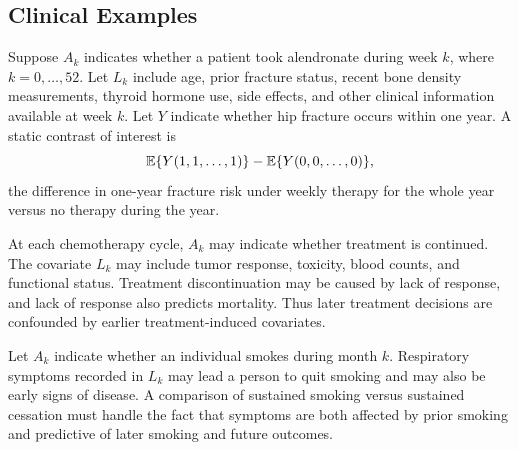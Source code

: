 \subsection{Clinical Examples}

\begin{example}
Suppose $A_k$ indicates whether a patient took alendronate during week $k$,
where $k=0,\ldots,52$. Let $L_k$ include age, prior fracture status, recent bone
density measurements, thyroid hormone use, side effects, and other clinical
information available at week $k$. Let $Y$ indicate whether hip fracture occurs
within one year. A static contrast of interest is
\[
  \mathbb{E}\{Y(1,1,\ldots,1)\}-\mathbb{E}\{Y(0,0,\ldots,0)\},
\]
the difference in one-year fracture risk under weekly therapy for the whole year
versus no therapy during the year.
\end{example}

\begin{example}
At each chemotherapy cycle, $A_k$ may indicate whether treatment is continued.
The covariate $L_k$ may include tumor response, toxicity, blood counts, and
functional status. Treatment discontinuation may be caused by lack of response,
and lack of response also predicts mortality. Thus later treatment decisions are
confounded by earlier treatment-induced covariates.
\end{example}

\begin{example}
Let $A_k$ indicate whether an individual smokes during month $k$. Respiratory
symptoms recorded in $L_k$ may lead a person to quit smoking and may also be
early signs of disease. A comparison of sustained smoking versus sustained
cessation must handle the fact that symptoms are both affected by prior smoking
and predictive of later smoking and future outcomes.
\end{example}
